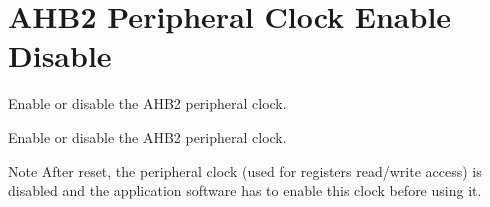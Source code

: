 \hypertarget{group___r_c_c_ex___a_h_b2___clock___enable___disable}{}\section{A\+H\+B2 Peripheral Clock Enable Disable}
\label{group___r_c_c_ex___a_h_b2___clock___enable___disable}


Enable or disable the A\+H\+B2 peripheral clock.  


Enable or disable the A\+H\+B2 peripheral clock. 

\begin{DoxyNote}{Note}
After reset, the peripheral clock (used for registers read/write access) is disabled and the application software has to enable this clock before using it. 
\end{DoxyNote}
